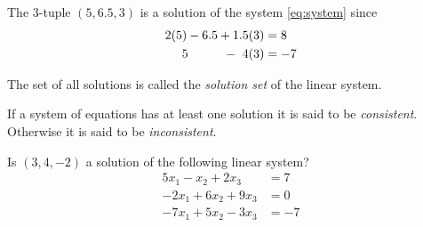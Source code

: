 \documentclass[12pt,letterpaper,reqno]{article}
\numberwithin{equation}{section}
\newcommand{\ti}[1]{\textit{#1}}
\begin{document}
\begin{example}
The 3-tuple $(5,6.5,3)$ is a solution of the system \eqref{eq:system} since
	\begin{equation*}
\begin{split}
	2(5)-6.5+1.5(3)&=8 \\
	5  \hspace{1.0cm} - \ 4(3)&=-7
\end{split}
\end{equation*}	
\end{example}

\begin{defn} \label{def:solution_set}
The set of all solutions is called the \ti{solution set} of the linear system.	
\end{defn}

\begin{defn}\label{def:consistent}
If a system of equations has at least one solution it is said to be \ti{consistent}. Otherwise it is said to be \ti{inconsistent}.	
\end{defn}

\begin{exercise}
Is $(3,4,-2)$ a solution of the following linear system?
\begin{align*}
	5x_1-x_2+2x_3 &=7 \\
	-2x_1+6x_2+9x_3&=0 \\
	-7x_1+5x_2-3x_3&=-7
\end{align*} 	
\end{exercise}
\end{document}
